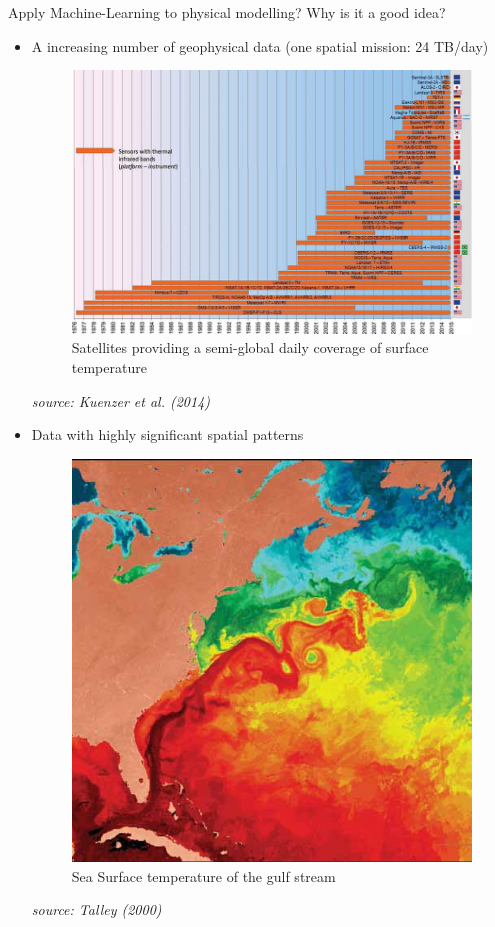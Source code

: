 \documentclass[handout]{beamer}
\newcommand{\rref}[1][]{\hfill{\scriptsize\textit{#1}}}
\begin{document}
\begin{frame}{Apply Machine-Learning to physical modelling?}
\alert{Why is it a good idea?}
    \begin{itemize}
        \item A increasing number of geophysical data (one spatial mission: 24 TB/day)
           {
        \begin{figure}
\includegraphics[width=.55\textwidth]{fig/L1/sat-sst.png}
\caption*{Satellites providing a semi-global daily coverage of surface temperature}
\end{figure}
\rref[source: Kuenzer et al. (2014)]
}
        \item <2->Data with highly significant spatial patterns
                   {
        \begin{figure}
\includegraphics[width=.36\textwidth]{fig/L1/Satellite-image-of-sea-surface-temperature-showing-the-gulf-Stream-and-large-rings-and_W640.jpg}
\caption*{Sea Surface temperature of the gulf stream}
\end{figure}
\rref[source: Talley (2000)]
}
    \end{itemize}
\end{frame}
\end{document}
